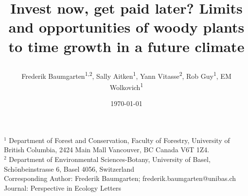 \documentclass{article}
\begin{document}
	
	
	\title{Invest now, get paid later? Limits and opportunities of woody plants to time growth in a future climate %
		
		
		
		
	
	} 
	
	\date{\today}
	\author{Frederik Baumgarten\textsuperscript{1,2}, Sally Aitken\textsuperscript{1}, Yann Vitasse\textsuperscript{2}, Rob Guy\textsuperscript{1}, EM Wolkovich\textsuperscript{1}}
	\maketitle
	
	$^1$ Department of Forest and Conservation, Faculty of Forestry, University of British Columbia, 2424 Main Mall
	Vancouver, BC Canada V6T 1Z4. \\
	
	$^2$  
	Department of Environmental Sciences-Botany, University of Basel, Schönbeinstrasse 6, Basel 4056, Switzerland
	\\
	
	Corresponding Author: Frederik Baumgarten; frederik.baumgarten@unibas.ch \\
	Journal: Perspective in Ecology Letters
	
	
	
\end{document}
